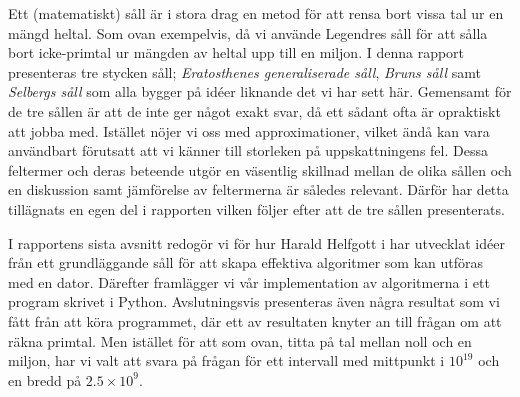Ett (matematiskt) såll är i stora drag en metod för att rensa bort vissa tal ur en mängd heltal.
Som ovan exempelvis, då vi använde Legendres såll för att sålla bort icke-primtal ur mängden av heltal upp till en miljon.
I denna rapport presenteras tre stycken såll;
\textit{Eratosthenes generaliserade såll}, \textit{Bruns såll} samt \textit{Selbergs såll} som alla bygger på idéer liknande det vi har sett här.
Gemensamt för de tre sållen är att de inte ger något exakt svar, då ett sådant ofta är opraktiskt att jobba med.
Istället nöjer vi oss med approximationer, vilket ändå kan vara användbart förutsatt att vi känner till storleken på uppskattningens fel.
Dessa feltermer och deras beteende utgör en väsentlig skillnad mellan de olika sållen och en diskussion samt jämförelse av feltermerna är således relevant. Därför har detta tillägnats en egen del i rapporten vilken följer efter att de tre sållen presenterats.


I rapportens sista avsnitt redogör vi för hur Harald Helfgott i \cite{HaraldSieve} har utvecklat idéer från ett grundläggande såll för att skapa effektiva algoritmer som kan utföras med en dator. 
Därefter framlägger vi vår implementation av algoritmerna i ett program skrivet i Python.
Avslutningsvis presenteras även några resultat som vi fått från att köra programmet,
där ett av resultaten knyter an till frågan om att räkna primtal.
Men istället för att som ovan, titta på tal mellan noll och en miljon, har vi valt att svara på frågan för ett intervall med mittpunkt i $10^{19}$ och en bredd på $2.5\times10^9$.